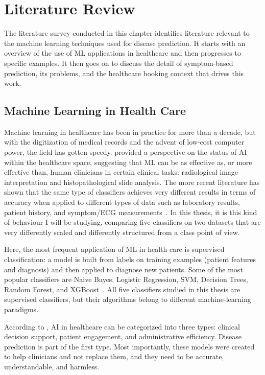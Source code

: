 \chapter{Literature Review}
\label{ch:literature_review}

The literature survey conducted in this chapter identifies literature relevant to the machine learning techniques used for disease prediction. It starts with an overview of the use of ML applications in healthcare and then progresses to specific examples. It then goes on to discuss the detail of symptom-based prediction, its problems, and the healthcare booking context that drives this work.

\section{Machine Learning in Health Care}
\label{sec:ml_healthcare}

Machine learning in healthcare has been in practice for more than a decade, but with the digitization of medical records and the advent of low-cost computer power, the field has gotten speedy. \citet{Topol2019} provided a perspective on the status of AI within the healthcare space, suggesting that ML can be as effective as, or more effective than, human clinicians in certain clinical tasks: radiological image interpretation and histopathological slide analysis. The more recent literature has shown that the same type of classifiers achieves very different results in terms of accuracy when applied to different types of data such as laboratory results, patient history, and symptom/ECG measurements~\citep{Mohamed2025}. In this thesis, it is this kind of behaviour I will be studying, comparing five classifiers on two datasets that are very differently scaled and differently structured from a class point of view.

Here, the most frequent application of ML in health care is supervised classification: a model is built from labels on training examples (patient features and diagnosis) and then applied to diagnose new patients. Some of the most popular classifiers are Naive Bayes, Logistic Regression, SVM, Decision Trees, Random Forest, and XGBoost~\citep{Sarker2021}. All five classifiers studied in this thesis are supervised classifiers, but their algorithms belong to different machine-learning paradigms.

According to \citet{Davenport2019}, AI in healthcare can be categorized into three types: clinical decision support, patient engagement, and administrative efficiency. Disease prediction is part of the first type. Most importantly, these models were created to help clinicians and not replace them, and they need to be accurate, understandable, and harmless.

